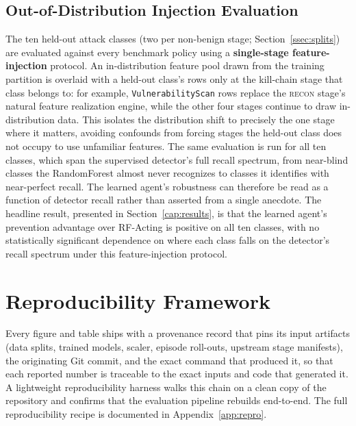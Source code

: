 \subsection{Out-of-Distribution Injection Evaluation}\label{ssec:f15}
The ten held-out attack classes (two per non-benign stage; Section~\ref{ssec:splits}) are evaluated against every benchmark policy using a \textbf{single-stage feature-injection} protocol. An in-distribution feature pool drawn from the training partition is overlaid with a held-out class's rows only at the kill-chain stage that class belongs to: for example, \texttt{VulnerabilityScan} rows replace the \textsc{recon} stage's natural feature realization engine, while the other four stages continue to draw in-distribution data. This isolates the distribution shift to precisely the one stage where it matters, avoiding confounds from forcing stages the held-out class does not occupy to use unfamiliar features. The same evaluation is run for all ten classes, which span the supervised detector's full recall spectrum, from near-blind classes the RandomForest almost never recognizes to classes it identifies with near-perfect recall. The learned agent's robustness can therefore be read as a function of detector recall rather than asserted from a single anecdote. The headline result, presented in Section~\ref{cap:results}, is that the learned agent's prevention advantage over RF-Acting is positive on all ten classes, with no statistically significant dependence on where each class falls on the detector's recall spectrum under this feature-injection protocol.

\section{Reproducibility Framework}\label{sec:repro_framework}
Every figure and table ships with a provenance record that pins its input artifacts (data splits, trained models, scaler, episode roll-outs, upstream stage manifests), the originating Git commit, and the exact command that produced it, so that each reported number is traceable to the exact inputs and code that generated it. A lightweight reproducibility harness walks this chain on a clean copy of the repository and confirms that the evaluation pipeline rebuilds end-to-end. The full reproducibility recipe is documented in Appendix~\ref{app:repro}.
